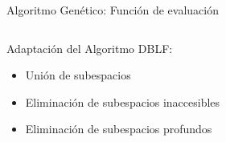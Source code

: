 \documentclass[handout]{beamer}
\begin{document}
\begin{frame}{Algoritmo Genético: Función de evaluación}
    \begin{columns}
        \begin{column}{0.5\textwidth}
            \begin{exampleblock}{Adaptación del Algoritmo DBLF:}
                \begin{itemize}[<+-| alert@+>]
                    \item Unión de subespacios
                    \item Eliminación de subespacios inaccesibles
                    \item Eliminación de subespacios profundos
                \end{itemize}
            \end{exampleblock}
        \end{column}
        \begin{column}{0.5\textwidth}
            \begin{overlayarea}{\textwidth}{\textheight}
\end{overlayarea}
\end{column}
\end{columns}
\end{frame}
\end{document}
